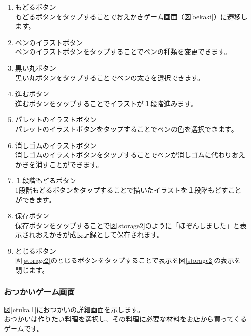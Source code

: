 \documentclass[a4j]{jarticle}
\begin{document}
\begin{enumerate}
  \renewcommand{\labelenumi}{\textcircled{\scriptsize \theenumi}}
\item もどるボタン\\
  もどるボタンをタップすることでおえかきゲーム画面（図\ref{oekaki}）に遷移します。
\item ペンのイラストボタン\\
  ペンのイラストボタンをタップすることでペンの種類を変更できます。
\item 黒い丸ボタン\\
  黒い丸ボタンをタップすることでペンの太さを選択できます。
\item 進むボタン\\
  進むボタンをタップすることでイラストが１段階進みます。
\item パレットのイラストボタン\\
  パレットのイラストボタンをタップすることでペンの色を選択できます。
\item 消しゴムのイラストボタン\\
  消しゴムのイラストボタンをタップすることでペンが消しゴムに代わりおえかきを消すことができます。
\item １段階もどるボタン\\
  1段階もどるボタンをタップすることで描いたイラストを１段階もどすことができます。
\item 保存ボタン\\
  保存ボタンをタップすることで図\ref{storage2}のように「ほぞんしました」と表示されおえかきが成長記録として保存されます。
\item とじるボタン\\
  図\ref{storage2}のとじるボタンをタップすることで表示を図\ref{storage2}の表示を閉じます。
\end{enumerate}

\newpage
\subsubsection{おつかいゲーム画面}
図\ref{otukai1}におつかいの詳細画面を示します。\\
おつかいは作りたい料理を選択し、その料理に必要な材料をお店から買ってくるゲームです。\\
\end{document}
